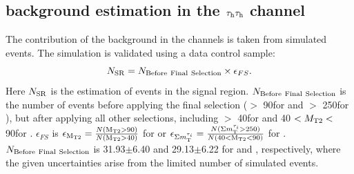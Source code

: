 \subsection{\texorpdfstring{\wjets background estimation in the $\tau_{\rm h}\tau_{\rm h}$ channel}{W+jets background estimation in the tau-tau channel}}
\label{sect:bkgW}
The contribution of the \wjets background in the \tauTau channels is taken from simulated events. The simulation is validated using a data control sample: 
\begin{equation}
N_{\rm SR} = N_{\rm Before~Final~Selection} \times \epsilon_{FS}.
\end{equation}
Here $N_{\rm SR}$ is the estimation of \wjets events in the signal region. $N_{\rm Before~Final~Selection}$ is the number of 
\wjets events before applying the final selection (\mttwo $>$ 90\GeV for \binone and \SumMT $>$ 250\GeV for \bintwo), but after applying all other selections, including \mttwo $>$ 40\GeV for \binone and 40 $<{M_{\rm T2}}<$ 90\GeV for \bintwo.  
$\epsilon_{FS}$ is $\epsilon_{ \rm M_{T2}}= \frac{N (\rm M_{T2}>90)}{N (\rm M_{T2}>40)}$ for \binone or  
$\epsilon_{\Sigma m_{\rm T}^{\tau_i}}=\frac{N (\Sigma m_{\rm T}^{\tau_i}>250)}{N(40<\rm M_{T2}<90)}$ for \bintwo. $N_{\rm Before~Final~Selection}$ is 31.93$\pm$6.40 and 29.13$\pm$6.22 for \binone and
\bintwo, respectively, where the given uncertainties arise from the limited number of simulated events. 


